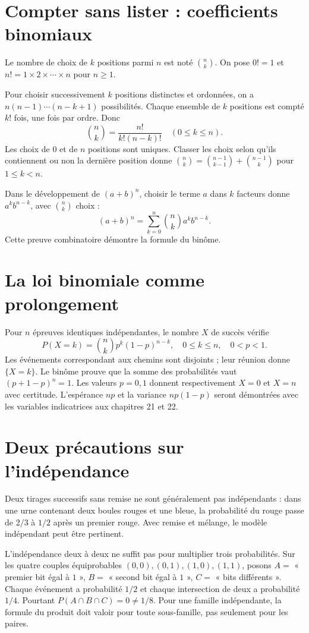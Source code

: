 \documentclass[../cours_1re.tex]{subfiles}
\begin{document}
\section{Compter sans lister : coefficients binomiaux}
\approfondissement
Le nombre de choix de $k$ positions parmi $n$ est noté $\binom nk$.
On pose $0!=1$ et $n!=1\times2\times\cdots\times n$ pour $n\ge1$.
\begin{demonstration}
Pour choisir successivement $k$ positions distinctes et ordonnées, on a
$n(n-1)\cdots(n-k+1)$ possibilités. Chaque ensemble de $k$ positions
est compté $k!$ fois, une fois par ordre. Donc
\[
\binom nk=\frac{n!}{k!(n-k)!}\quad(0\le k\le n).
\]
Les choix de $0$ et de $n$ positions sont uniques.
Classer les choix selon qu'ils contiennent ou non la dernière position donne
$\binom nk=\binom{n-1}{k-1}+\binom{n-1}{k}$ pour $1\le k<n$.
\end{demonstration}
Dans le développement de $(a+b)^n$, choisir le terme $a$ dans $k$
facteurs donne $a^kb^{n-k}$, avec $\binom nk$ choix :
\[
(a+b)^n=\sum_{k=0}^n\binom nk a^kb^{n-k}.
\]
Cette preuve combinatoire démontre la formule du binôme.

\section{La loi binomiale comme prolongement}
Pour $n$ épreuves identiques indépendantes, le nombre $X$ de succès vérifie
\[
P(X=k)=\binom nk p^k(1-p)^{n-k},\quad 0\le k\le n,\quad 0<p<1.
\]
Les événements correspondant aux chemins sont disjoints ; leur réunion donne
$\{X=k\}$. Le binôme prouve que la somme des probabilités vaut
$(p+1-p)^n=1$. Les valeurs $p=0,1$ donnent respectivement $X=0$ et $X=n$
avec certitude. L'espérance $np$ et la variance $np(1-p)$ seront démontrées
avec les variables indicatrices aux chapitres 21 et 22.

\section{Deux précautions sur l'indépendance}
Deux tirages successifs sans remise ne sont généralement pas indépendants :
dans une urne contenant deux boules rouges et une bleue, la probabilité
du rouge passe de $2/3$ à $1/2$ après un premier rouge.
Avec remise et mélange, le modèle indépendant peut être pertinent.

\approfondissement
L'indépendance deux à deux ne suffit pas pour multiplier trois probabilités.
Sur les quatre couples équiprobables $(0,0),(0,1),(1,0),(1,1)$, posons
$A=$ « premier bit égal à $1$ », $B=$ « second bit égal à $1$ »,
$C=$ « bits différents ». Chaque événement a probabilité $1/2$ et chaque
intersection de deux a probabilité $1/4$. Pourtant
$P(A\cap B\cap C)=0\ne1/8$.
Pour une famille indépendante, la formule du produit doit valoir pour
toute sous-famille, pas seulement pour les paires.
\end{document}
